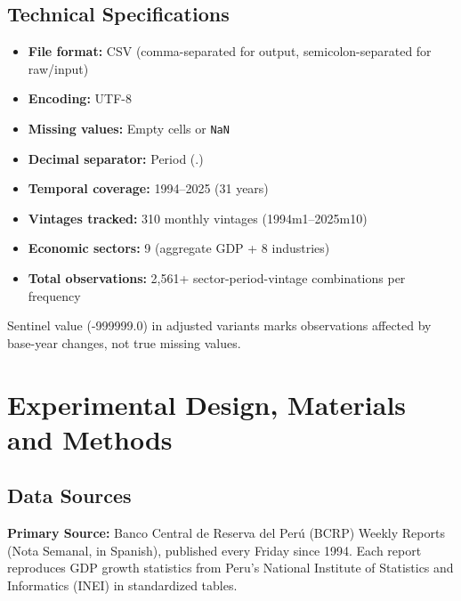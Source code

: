 \documentclass[12pt]{article}
\begin{document}
\subsection*{Technical Specifications}

\begin{itemize}
    \item \textbf{File format:} CSV (comma-separated for output, semicolon-separated for raw/input)
    \item \textbf{Encoding:} UTF-8
    \item \textbf{Missing values:} Empty cells or \texttt{NaN}
    \item \textbf{Decimal separator:} Period (.)
    \item \textbf{Temporal coverage:} 1994--2025 (31 years)
    \item \textbf{Vintages tracked:} 310 monthly vintages (1994m1--2025m10)
    \item \textbf{Economic sectors:} 9 (aggregate GDP + 8 industries)
    \item \textbf{Total observations:} 2,561+ sector-period-vintage combinations per frequency
\end{itemize}

Sentinel value (-999999.0) in adjusted variants marks observations affected by base-year changes, not true missing values.

\section*{Experimental Design, Materials and Methods}


\subsection*{Data Sources}

\textbf{Primary Source:} Banco Central de Reserva del Perú (BCRP) Weekly Reports (Nota Semanal, in Spanish), published every Friday since 1994. Each report reproduces GDP growth statistics from Peru's National Institute of Statistics and Informatics (INEI) in standardized tables.
\end{document}
